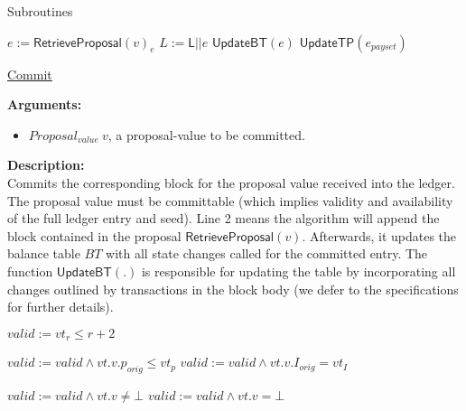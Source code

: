 \documentclass[10pt,a4paper]{article}
\begin{document}
\begin{section}{Subroutines}

\begin{algorithm}[H]
    \begin{algorithmic}[1]

    \State $e := \mathsf{RetrieveProposal}(v)_e$ 
    \State $L := \mathsf{L} || e$
    \State $\mathsf{UpdateBT}(e)$
    \State $\mathsf{UpdateTP}(e_{payset})$

    \EndFunction
    \end{algorithmic}
    \caption{\underline{Commit}}
\end{algorithm}


\noindent \textbf{Arguments:}
\begin{itemize}
    \item $Proposal_{value} \ v$, a proposal-value to be committed.
  \end{itemize}

\noindent \textbf{Description:}\\
Commits the corresponding block for the proposal value received into the ledger.
The proposal value must be committable (which implies validity and availability of the full
ledger entry and seed).
Line 2 means the algorithm will append the block contained in the proposal $\mathsf{RetrieveProposal}(v)$.
Afterwards, it updates the balance table $BT$ with all state changes called for the committed entry.
The function $\mathsf{UpdateBT}(.)$ is responsible for updating the table by incorporating all changes
outlined by transactions in the block body (we defer to the specifications for further details). 


\begin{algorithm}[H]\label{algo:verify-vote}
    \begin{algorithmic}[1]
        \State $valid := vt_r \leq r+2$
        
            \State $valid := valid \land vt.v.p_{orig} \leq vt_p$
                \State $valid := valid \land vt.v.I_{orig} = vt_I$
            \EndIf
        \EndIf
        
            \State $valid := valid \land vt.v \neq \bot$
            \State $valid := valid \land vt.v = \bot$
        \EndIf


\end{algorithmic}
\end{algorithm}
\end{section}
\end{document}
